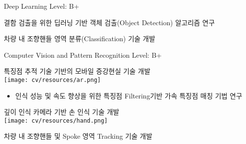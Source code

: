 


\begin{cventries}
  \cventry
    {Deep Learning} %
    {} %
    {} %
    {Level: B+} %
    {
      \begin{cvitems} %
        \item {결함 검출을 위한 딥러닝 기반 객체 검출(Object Detection) 알고리즘 연구}
        \item {차량 내 조향핸들 영역 분류(Classification) 기술 개발}
      \end{cvitems}
    }

  \cventry
    {Computer Vision and Pattern Recognition} %
    {} %
    {} %
    {Level: B+} %
    {
      \begin{cvitems} %
        \item {특징점 추적 기술 기반의 모바일 증강현실 기술 개발 \\
               \texttt{[image: cv/resources/ar.png]} }
          \begin{itemize}
            \item {인식 성능 및 속도 향상을 위한 특징점 Filtering기반 가속 특징점 매칭 기법 연구}
          \end{itemize}
        \item {깊이 인식 카메라 기반 손 인식 기술 개발 \\
               \texttt{[image: cv/resources/hand.png]} }
        \item {차량 내 조향핸들 및 Spoke 영역 Tracking 기술 개발}
      \end{cvitems}
    }


\end{cventries}
